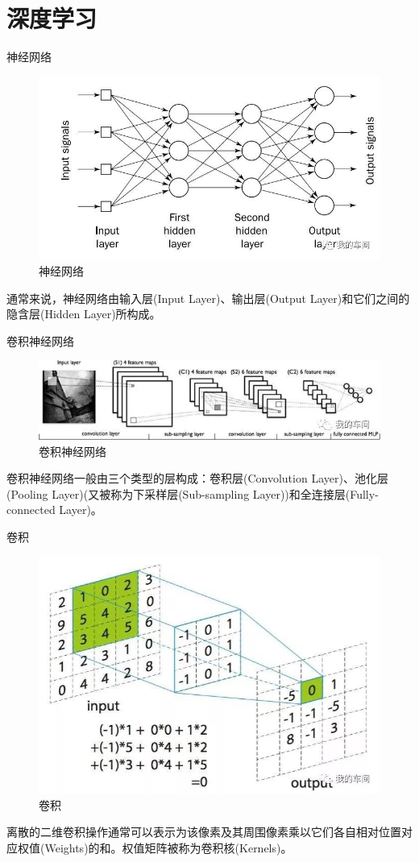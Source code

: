 \documentclass[presentation]{beamer}
\begin{document}
\section{深度学习}
\begin{frame}{神经网络}
    \begin{figure}
        \centering
          \includegraphics[width=0.8\linewidth]{2_0.jpg}
          \caption{神经网络}
    \end{figure}
    通常来说，神经网络由输入层(Input Layer)、输出层(Output Layer)和它们之间的隐含层(Hidden Layer)所构成。
\end{frame}

\begin{frame}{卷积神经网络}
    \begin{figure}
        \centering
          \includegraphics[width=0.8\linewidth]{2_1.jpg}
          \caption{卷积神经网络}
    \end{figure}
    卷积神经网络一般由三个类型的层构成：卷积层(Convolution Layer)、池化层(Pooling Layer)(又被称为下采样层(Sub-sampling Layer))和全连接层(Fully-connected Layer)。
\end{frame}

\begin{frame}{卷积}
    \begin{figure}
        \centering
          \includegraphics[width=0.7\linewidth]{2_2.jpg}
          \caption{卷积}
    \end{figure}
    离散的二维卷积操作通常可以表示为该像素及其周围像素乘以它们各自相对位置对应权值(Weights)的和。权值矩阵被称为卷积核(Kernels)。
\end{frame}
\end{document}
